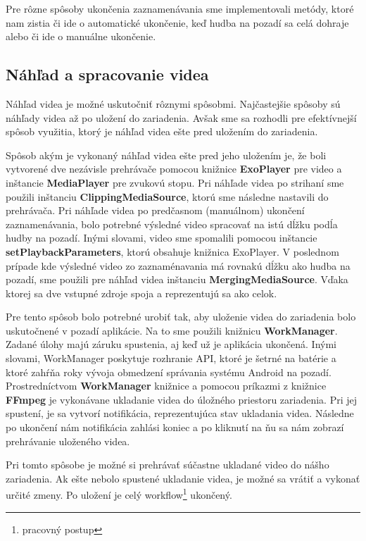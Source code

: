 \documentclass[12pt, oneside]{book}
\begin{document}
Pre rôzne spôsoby ukončenia zaznamenávania sme implementovali metódy, ktoré nam zistia či ide o automatické ukončenie, keď hudba na pozadí sa celá dohraje alebo či ide o manuálne ukončenie.

\subsection{Náhľad a spracovanie videa}

\hspace{15pt} Náhľad videa je možné uskutočniť rôznymi spôsobmi. Najčastejšie spôsoby sú náhľady videa až po uložení do zariadenia. Avšak sme sa rozhodli pre efektívnejší spôsob využitia, ktorý je náhľad videa ešte pred uložením do zariadenia. 

Spôsob akým je vykonaný náhľad videa ešte pred jeho uložením je, že boli vytvorené dve nezávisle prehrávače pomocou knižnice \textbf{ExoPlayer} pre video a inštancie \textbf{MediaPlayer} pre zvukovú stopu. Pri náhľade videa po strihaní sme použili inštanciu \textbf{ClippingMediaSource}, ktorú sme následne nastavili do prehrávača. Pri náhľade videa po predčasnom (manuálnom) ukončení zaznamenávania, bolo potrebné výsledné video spracovať na istú dĺžku podĺa hudby na pozadí. Inými slovami, video sme spomalili pomocou inštancie \textbf{setPlaybackParameters}, ktorú obsahuje knižnica ExoPlayer. V poslednom prípade kde výsledné video zo zaznaménavania má rovnakú dĺžku ako hudba na pozadí, sme použili pre náhľad videa inštanciu \textbf{MergingMediaSource}. Vďaka ktorej sa dve vstupné zdroje spoja a reprezentujú sa ako celok.

Pre tento spôsob bolo potrebné urobiť tak, aby uloženie videa do zariadenia bolo uskutočnené v pozadí aplikácie. Na to sme použili knižnicu \textbf{WorkManager}. Zadané úlohy majú záruku spustenia, aj keď už je aplikácia ukončená. Inými slovami, WorkManager poskytuje rozhranie API, ktoré je šetrné na batérie a ktoré zahŕňa roky vývoja obmedzení správania systému Android na pozadí. Prostredníctvom \textbf{WorkManager} knižnice a pomocou príkazmi z knižnice \textbf{FFmpeg} je vykonávane ukladanie videa do úložného priestoru zariadenia. Pri jej spustení, je sa vytvorí notifikácia, reprezentujúca stav ukladania videa. Následne po ukončení nám notifikácia zahlási koniec a po kliknutí na ňu sa nám zobrazí prehrávanie uloženého videa.

Pri tomto spôsobe je možné si prehrávať súčastne ukladané video do nášho zariadenia. Ak ešte nebolo spustené ukladanie videa, je možné sa vrátiť a vykonať určité zmeny. Po uložení je celý workflow\footnote{pracovný postup} ukončený.
\end{document}
